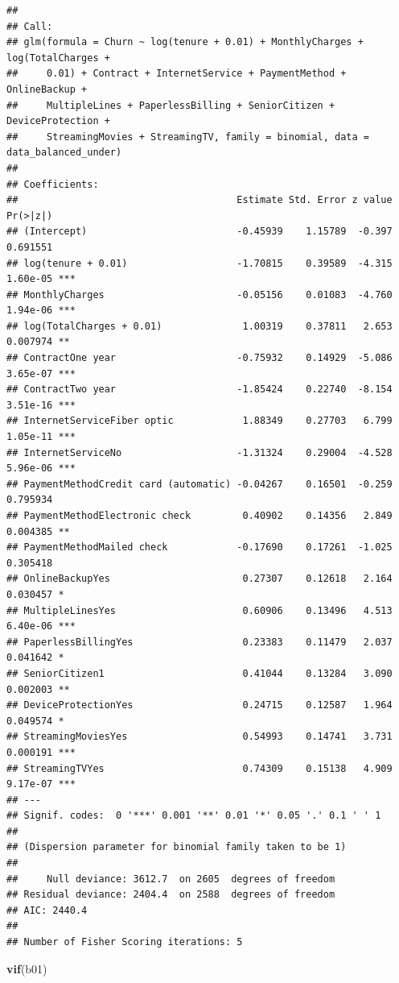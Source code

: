 \documentclass[
  twoside]{article}
\newenvironment{Shaded}{\begin{snugshade}}{\end{snugshade}}
\newcommand{\FunctionTok}[1]{\textcolor[rgb]{0.13,0.29,0.53}{\textbf{#1}}}
\newcommand{\NormalTok}[1]{#1}
\begin{document}
\begin{verbatim}
## 
## Call:
## glm(formula = Churn ~ log(tenure + 0.01) + MonthlyCharges + log(TotalCharges + 
##     0.01) + Contract + InternetService + PaymentMethod + OnlineBackup + 
##     MultipleLines + PaperlessBilling + SeniorCitizen + DeviceProtection + 
##     StreamingMovies + StreamingTV, family = binomial, data = data_balanced_under)
## 
## Coefficients:
##                                      Estimate Std. Error z value Pr(>|z|)    
## (Intercept)                          -0.45939    1.15789  -0.397 0.691551    
## log(tenure + 0.01)                   -1.70815    0.39589  -4.315 1.60e-05 ***
## MonthlyCharges                       -0.05156    0.01083  -4.760 1.94e-06 ***
## log(TotalCharges + 0.01)              1.00319    0.37811   2.653 0.007974 ** 
## ContractOne year                     -0.75932    0.14929  -5.086 3.65e-07 ***
## ContractTwo year                     -1.85424    0.22740  -8.154 3.51e-16 ***
## InternetServiceFiber optic            1.88349    0.27703   6.799 1.05e-11 ***
## InternetServiceNo                    -1.31324    0.29004  -4.528 5.96e-06 ***
## PaymentMethodCredit card (automatic) -0.04267    0.16501  -0.259 0.795934    
## PaymentMethodElectronic check         0.40902    0.14356   2.849 0.004385 ** 
## PaymentMethodMailed check            -0.17690    0.17261  -1.025 0.305418    
## OnlineBackupYes                       0.27307    0.12618   2.164 0.030457 *  
## MultipleLinesYes                      0.60906    0.13496   4.513 6.40e-06 ***
## PaperlessBillingYes                   0.23383    0.11479   2.037 0.041642 *  
## SeniorCitizen1                        0.41044    0.13284   3.090 0.002003 ** 
## DeviceProtectionYes                   0.24715    0.12587   1.964 0.049574 *  
## StreamingMoviesYes                    0.54993    0.14741   3.731 0.000191 ***
## StreamingTVYes                        0.74309    0.15138   4.909 9.17e-07 ***
## ---
## Signif. codes:  0 '***' 0.001 '**' 0.01 '*' 0.05 '.' 0.1 ' ' 1
## 
## (Dispersion parameter for binomial family taken to be 1)
## 
##     Null deviance: 3612.7  on 2605  degrees of freedom
## Residual deviance: 2404.4  on 2588  degrees of freedom
## AIC: 2440.4
## 
## Number of Fisher Scoring iterations: 5
\end{verbatim}

\begin{Shaded}
\begin{Highlighting}[]
\FunctionTok{vif}\NormalTok{(b01)}
\end{Highlighting}
\end{Shaded}
\end{document}
